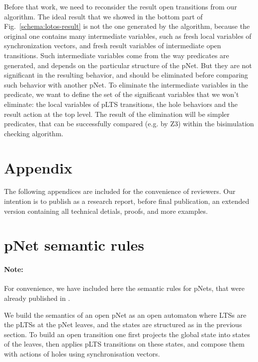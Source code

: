 \documentclass{lncs/llncs}
\begin{document}
Before that work, we need to reconsider the result open transitions
from our algorithm. The ideal
result that we showed in the bottom part of
Fig.~\ref{schema:lotos-result} is not the one generated by the algorithm,
because the original one contains many intermediate
variables, such as fresh local variables of synchronization
vectors, and fresh result variables of intermediate open transitions.
Such intermediate variables come from the way predicates are
generated, and depends on the particular structure of the pNet. But
they are not significant in the resulting behavior, and should be
eliminated before comparing such behavior with another pNet.
To eliminate the intermediate variables in the predicate, we want to define
the set of the significant variables that we won't eliminate: the
local variables of pLTS transitions, the hole behaviors and the result
action at the top level.
The result of the elimination will be simpler predicates, that can be
successfully compared (e.g. by Z3) within the bisimulation checking
algorithm.





% 


\newpage
\appendix
\section{Appendix}
The following appendices are included for the convenience of reviewers.
Our intention is to publish as a research report, before final publication, an
extended version containing all technical detials, proofs, and more examples.


\section{pNet semantic rules}
\label{appendix:semRules}

\paragraph{Note:} For convenience, we have included here the semantic rules for pNets,
that were already published in \cite{henrio:Forte2016}.

We build the semantics of an open pNet as an open automaton where
LTSs are the pLTSs at 
the pNet leaves, and the states are structured as in
the previous section. 
To build an open transition one first
 projects the global state into states of the leaves, then applies
pLTS transitions on these states, and compose them with actions of
holes using synchronisation vectors. %
\end{document}
